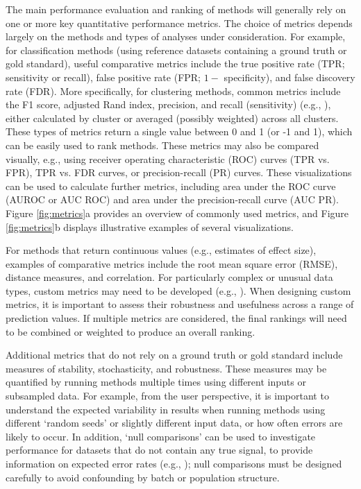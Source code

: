 \documentclass[12pt, a4paper]{article}
\begin{document}
The main performance evaluation and ranking of methods will generally rely on one or more key quantitative performance metrics. The choice of metrics depends largely on the methods and types of analyses under consideration. For example, for classification methods (using reference datasets containing a ground truth or gold standard), useful comparative metrics include the true positive rate (TPR; sensitivity or recall), false positive rate (FPR; $1 -$ specificity), and false discovery rate (FDR). More specifically, for clustering methods, common metrics include the F1 score, adjusted Rand index, precision, and recall (sensitivity) (e.g., \citep{Duo2018, Weber2016, Aghaeepour2013}), either calculated by cluster or averaged (possibly weighted) across all clusters. These types of metrics return a single value between 0 and 1 (or -1 and 1), which can be easily used to rank methods. These metrics may also be compared visually, e.g., using receiver operating characteristic (ROC) curves (TPR vs. FPR), TPR vs. FDR curves, or precision-recall (PR) curves. These visualizations can be used to calculate further metrics, including area under the ROC curve (AUROC or AUC ROC) and area under the precision-recall curve (AUC PR). Figure \ref{fig:metrics}a provides an overview of commonly used metrics, and Figure \ref{fig:metrics}b displays illustrative examples of several visualizations.

For methods that return continuous values (e.g., estimates of effect size), examples of comparative metrics include the root mean square error (RMSE), distance measures, and correlation. For particularly complex or unusual data types, custom metrics may need to be developed (e.g., \citep{Saelens2018b}). When designing custom metrics, it is important to assess their robustness and usefulness across a range of prediction values. If multiple metrics are considered, the final rankings will need to be combined or weighted to produce an overall ranking.

Additional metrics that do not rely on a ground truth or gold standard include measures of stability, stochasticity, and robustness. These measures may be quantified by running methods multiple times using different inputs or subsampled data. For example, from the user perspective, it is important to understand the expected variability in results when running methods using different `random seeds' or slightly different input data, or how often errors are likely to occur. In addition, `null comparisons' can be used to investigate performance for datasets that do not contain any true signal, to provide information on expected error rates (e.g., \citep{Weber2018, Law2014}); null comparisons must be designed carefully to avoid confounding by batch or population structure.
\end{document}
